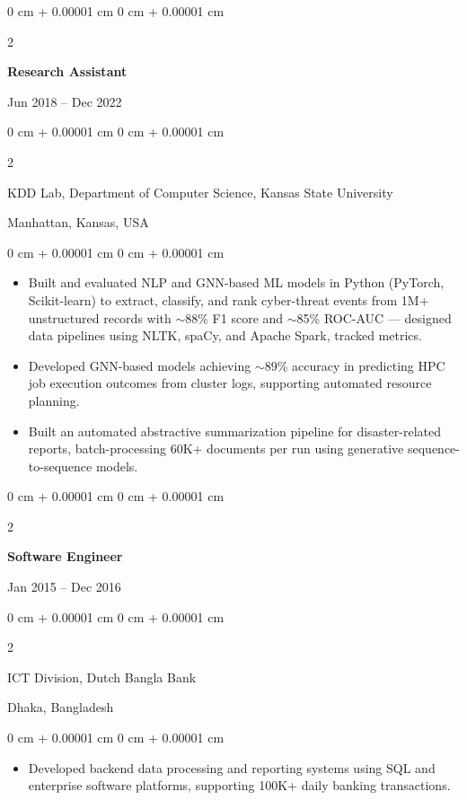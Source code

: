\documentclass[10pt, letterpaper]{article}
\newenvironment{highlights}{
    \begin{itemize}[
        topsep=0.10 cm,
        parsep=0.10 cm,
        partopsep=0pt,
        itemsep=0pt,
        leftmargin=0 cm + 10pt
    ]
}{
    \end{itemize}
} %
\newenvironment{onecolentry}{
    \begin{adjustwidth}{
        0 cm + 0.00001 cm
    }{
        0 cm + 0.00001 cm
    }
}{
    \end{adjustwidth}
} %
\newenvironment{twocolentry}[2][]{
    \onecolentry
    \def\secondColumn{#2}
    \setcolumnwidth{\fill, 4.5 cm}
    \begin{paracol}{2}
}{
    \switchcolumn \raggedleft \secondColumn
    \end{paracol}
    \endonecolentry
} %
\begin{document}
    \vspace{1mm}

    \begin{twocolentry}{Jun 2018 -- Dec 2022}
        \textbf{Research Assistant}
    \end{twocolentry}
    \begin{twocolentry}{Manhattan, Kansas, USA}
       KDD Lab, Department of Computer Science, Kansas State University
    \end{twocolentry}
    \vspace{0.10 cm}
    \begin{onecolentry}
        \begin{highlights}
            \item Built and evaluated NLP and GNN-based ML models in Python (PyTorch, Scikit-learn) to extract, classify, and rank cyber-threat events from 1M+ unstructured records with $\sim$88\% F1 score and $\sim$85\% ROC-AUC — designed data pipelines using NLTK, spaCy, and Apache Spark, tracked metrics.
            \item Developed GNN-based models achieving $\sim$89\% accuracy in predicting HPC job execution outcomes from cluster logs, supporting automated resource planning.
            \item Built an automated abstractive summarization pipeline for disaster-related reports, batch-processing 60K+ documents per run using generative sequence-to-sequence models.
        \end{highlights}
    \end{onecolentry}

    \vspace{0.1 cm}
    \begin{twocolentry}{Jan 2015 -- Dec 2016}
        \textbf{Software Engineer}
    \end{twocolentry}
    \begin{twocolentry}{Dhaka, Bangladesh}
       ICT Division, Dutch Bangla Bank
    \end{twocolentry}

    \begin{onecolentry}
        \begin{highlights}
            \item Developed backend data processing and reporting systems using SQL and enterprise software platforms, supporting 100K+ daily banking transactions.
        \end{highlights}
    \end{onecolentry}
\end{document}
